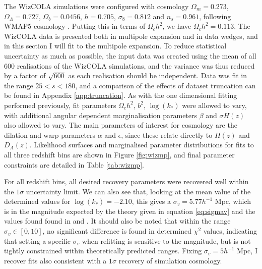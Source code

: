 \documentclass[titlesmallcaps, examinerscopy, copyrightpage]{uqthesis}
\begin{document}
The WizCOLA simulations were configured with cosmology $\Omega_m = 0.273$, $\Omega_\Lambda = 0.727$, $\Omega_b = 0.0456$, $h=0.705$, $\sigma_8 = 0.812$ and $n_s = 0.961$, following WMAP5 cosmology \citep{Komatsu2009}. Putting this in terms of $\Omega_c h^2$, we have $\Omega_c h^2 = 0.113$. The WizCOLA data is presented both in multipole expansion and in data wedges, and in this section I will fit to the multipole expansion. To reduce statistical uncertainty as much as possible, the input data was created using the mean of all 600 realisations of the WizCOLA simulations, and the variance was thus reduced by a factor of  $\sqrt{600}$ as each realisation should be independent. Data was fit in the range $25<s<180$, and a comparison of the effects of dataset truncation can be found in Appendix \ref{app:truncation}. As with the one dimensional fitting performed previously, fit parameters $\Omega_c h^2$, $b^2$, $\log(k_*)$ were allowed to vary, with additional angular dependent marginalisation parameters $\beta$ and $\sigma H(z)$ also allowed to vary. The main parameters of interest for cosmology are the dilation and warp parameters $\alpha$ and $\epsilon$, since these relate directly to $H(z)$ and $D_A(z)$. Likelihood surfaces and marginalised parameter distributions for fits to all three redshift bins are shown in Figure \ref{fig:wizmp}, and final parameter constraints are detailed in Table \ref{tab:wizmp}.

For all redshift bins, all desired recovery parameters were recovered well within the $1\sigma$ uncertainty limit. We can also see that, looking at the mean value of the determined values for $\log(k_*) = -2.10$, this gives a $\sigma_v = 5.77 h^{-1}$ Mpc, which  is in the magnitude expected by the theory given in equation \eqref{eq:sigmav} and the values found found in \citet{BlakeKazin2011} and \citet{BlakeDavis2011}. It should also be noted that within the range $\sigma_v \in [0,10]$, no significant difference is found in determined $\chi^2$ values, indicating that setting a specific $\sigma_v$ when refitting is sensitive to the magnitude, but is not tightly constrained within theoretically predicted ranges. Fixing $\sigma_v = 5 h^{-1}$ Mpc, I recover fits also consistent with a $1\sigma$ recovery of simulation cosmology.
\end{document}

